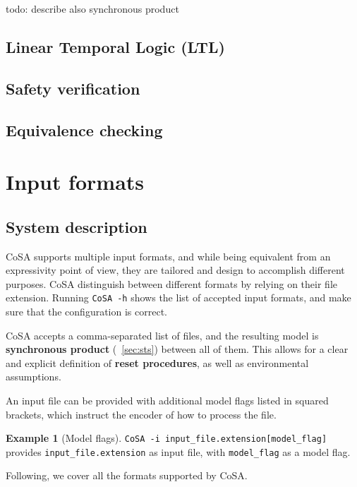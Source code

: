 \documentclass{article}
\theoremstyle{definition}
\newtheorem{example}{Example}[section]
\begin{document}
todo: describe also synchronous product


\subsection{Linear Temporal Logic (LTL)}
\label{sec:ltl}

\subsection{Safety verification}
\label{sec:safety}

\subsection{Equivalence checking}
\label{sec:equivalence}


\section{Input formats}
\label{sec:input_formats}

\subsection{System description}

CoSA supports multiple input formats, and while being equivalent from
an expressivity point of view, they are tailored and design to
accomplish different purposes. CoSA distinguish between different
formats by relying on their file extension. Running \texttt{CoSA -h}
shows the list of accepted input formats, and make sure that the
configuration is correct.

CoSA accepts a comma-separated list of files, and the resulting model
is \textbf{synchronous product} (\textsection~\ref{sec:sts}) between
all of them. This allows for a clear and explicit definition of
\textbf{reset procedures}, as well as environmental assumptions.

An input file can be provided with additional model flags listed in
squared brackets, which instruct the encoder of how to process the
file.

\begin{example}[Model flags]
   \texttt{CoSA -i input\_file.extension[model\_flag]} provides
   \texttt{input\_file.extension} as input file, with
   \texttt{model\_flag} as a model flag.
\end{example}


Following, we cover all the formats supported by CoSA.
\end{document}
